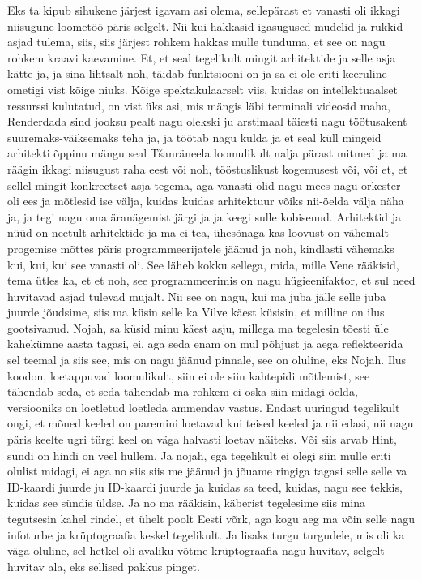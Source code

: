 Eks ta kipub sihukene järjest igavam asi olema, sellepärast et vanasti oli ikkagi niisugune loometöö päris selgelt.
Nii kui hakkasid igasugused mudelid ja rukkid asjad tulema, siis, siis järjest rohkem hakkas mulle tunduma, et see on nagu rohkem kraavi kaevamine. Et, et seal tegelikult mingit arhitektide ja selle asja kätte ja, ja sina lihtsalt noh, täidab funktsiooni on ja sa ei ole eriti keeruline ometigi vist kõige niuks.
Kõige spektakulaarselt viis, kuidas on intellektuaalset ressurssi kulutatud, on vist üks asi, mis mängis läbi terminali videosid maha, Renderdada sind jooksu pealt nagu olekski ju arstimaal täiesti nagu töötusakent suuremaks-väiksemaks teha ja, ja töötab nagu kulda ja et seal küll mingeid arhitekti õppinu mängu seal Tšanräneela loomulikult nalja pärast mitmed ja ma räägin ikkagi niisugust raha eest või noh, tööstuslikust kogemusest või, või et, et sellel mingit konkreetset asja tegema, aga vanasti olid nagu mees nagu orkester oli ees ja mõtlesid ise välja, kuidas kuidas arhitektuur võiks nii-öelda välja näha ja, ja tegi nagu oma äranägemist järgi ja ja keegi sulle kobisenud. Arhitektid ja nüüd on neetult arhitektide ja ma ei tea, ühesõnaga kas loovust on vähemalt progemise mõttes päris programmeerijatele jäänud ja noh, kindlasti vähemaks kui, kui, kui see vanasti oli. See läheb kokku sellega, mida, mille Vene rääkisid, tema ütles ka, et et noh, see programmeerimis on nagu hügieenifaktor, et sul need huvitavad asjad tulevad mujalt. Nii see on nagu, kui ma juba jälle selle juba juurde jõudsime, siis ma küsin selle ka Vilve käest küsisin, et milline on ilus gootsivanud.
Nojah, sa küsid minu käest asju, millega ma tegelesin tõesti üle kahekümne aasta tagasi, ei, aga seda enam on mul põhjust ja aega reflekteerida sel teemal ja siis see, mis on nagu jäänud pinnale, see on oluline, eks Nojah. Ilus koodon, loetappuvad loomulikult, siin ei ole siin kahtepidi mõtlemist, see tähendab seda, et seda tähendab ma rohkem ei oska siin midagi öelda, versiooniks on loetletud loetleda ammendav vastus.
Endast uuringud tegelikult ongi, et mõned keeled on paremini loetavad kui teised keeled ja nii edasi, nii nagu päris keelte ugri türgi keel on väga halvasti loetav näiteks. Või siis arvab Hint, sundi on hindi on veel hullem.
Ja nojah, ega tegelikult ei olegi siin mulle eriti olulist midagi, ei aga no siis siis me jäänud ja jõuame ringiga tagasi selle selle va ID-kaardi juurde ju ID-kaardi juurde ja kuidas sa teed, kuidas, nagu see tekkis, kuidas see sündis üldse. Ja no ma rääkisin, käberist tegelesime siis mina tegutsesin kahel rindel, et ühelt poolt Eesti võrk, aga kogu aeg ma võin selle nagu infoturbe ja krüptograafia keskel tegelikult. Ja lisaks turgu turgudele, mis oli ka väga oluline, sel hetkel oli avaliku võtme krüptograafia nagu huvitav, selgelt huvitav ala, eks sellised pakkus pinget.
